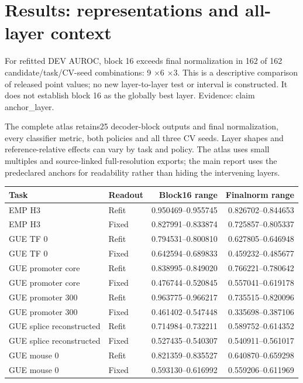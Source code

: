 \documentclass[11pt]{article}
\begin{document}
\section{Results: representations and all-layer context}
For refitted DEV AUROC, block 16 exceeds final normalization in 162 of 162 candidate/task/CV-seed combinations: 9 $\times$6 $\times$3. This is a descriptive comparison of released point values; no new layer-to-layer test or interval is constructed. It does not establish block 16 as the globally best layer. Evidence: claim anchor\_layer.\par
The complete atlas retains25 decoder-block outputs and final normalization, every classifier metric, both policies and all three CV seeds. Layer shapes and reference-relative effects can vary by task and policy. The atlas uses small multiples and source-linked full-resolution exports; the main report uses the predeclared anchors for readability rather than hiding the intervening layers.\par
\begin{center}\small
\begin{tabularx}{\textwidth}{Xlrr}\toprule Task & Readout & Block16 range & Finalnorm range\\\midrule
EMP H3 & Refit & 0.950469--0.955745 & 0.826702--0.844653\\
EMP H3 & Fixed & 0.827991--0.833874 & 0.725857--0.805337\\
GUE TF 0 & Refit & 0.794531--0.800810 & 0.627805--0.646948\\
GUE TF 0 & Fixed & 0.642594--0.689833 & 0.459232--0.485677\\
GUE promoter core & Refit & 0.838995--0.849020 & 0.766221--0.780642\\
GUE promoter core & Fixed & 0.476744--0.520845 & 0.557041--0.619178\\
GUE promoter 300 & Refit & 0.963775--0.966217 & 0.735515--0.820096\\
GUE promoter 300 & Fixed & 0.461402--0.547448 & 0.335698--0.387106\\
GUE splice reconstructed & Refit & 0.714984--0.732211 & 0.589752--0.614352\\
GUE splice reconstructed & Fixed & 0.527435--0.540307 & 0.540911--0.561017\\
GUE mouse 0 & Refit & 0.821359--0.835527 & 0.640870--0.659298\\
GUE mouse 0 & Fixed & 0.593130--0.616992 & 0.559206--0.611969\\
\bottomrule\end{tabularx}\end{center}
\end{document}

